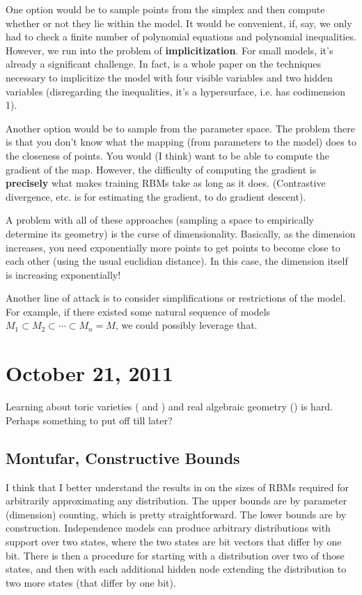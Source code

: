 \documentclass[12pt]{article}
\begin{document}
One option would be to sample points from the simplex and then compute whether
or not they lie within the model.  It would be convenient, if, say, we only had
to check a finite number of polynomial equations and polynomial inequalities.
However, we run into the problem of \textbf{implicitization}.  For small models,
it's already a significant challenge.  In fact, \cite{CTY10} is a whole paper on
the techniques necessary to implicitize the model with four visible variables
and two hidden variables (disregarding the inequalities, it's a hypersurface,
i.e. has codimension 1).

Another option would be to sample from the parameter space.  The problem there
is that you don't know what the mapping (from parameters to the model) does to
the closeness of points.  You would (I think) want to be able to compute the
gradient of the map.  However, the difficulty of computing the gradient is
\textbf{precisely} what makes training RBMs take as long as it does.
(Contrastive divergence, etc. is for estimating the gradient, to do gradient
descent).

A problem with all of these approaches (sampling a space to empirically
determine its geometry) is the curse of dimensionality.  Basically, as the
dimension increases, you need exponentially more points to get points to become
close to each other (using the usual euclidian distance).  In this case, the
dimension itself is increasing exponentially!

Another line of attack is to consider simplifications or restrictions of the
model.  For example, if there existed some natural sequence of models $M_1
\subset M_2 \subset \cdots \subset M_n = M$, we could possibly leverage that.

\section{October 21, 2011}

Learning about toric varieties (\cite{CLS09} and \cite{CLO98}) and real
algebraic geometry (\cite{Cos09}) is hard.  Perhaps something to put off till
later?

\subsection{Montufar, Constructive Bounds} 

I think that I better understand the results in \cite{Mon10} on the sizes of
RBMs required for arbitrarily approximating any distribution.  The upper bounds
are by parameter (dimension) counting, which is pretty straightforward.  The
lower bounds are by construction.  Independence models can produce arbitrary
distributions with support over two states, where the two states are bit vectors
that differ by one bit.  There is then a procedure for starting with a
distribution over two of those states, and then with each additional hidden node
extending the distribution to two more states (that differ by one bit).
\end{document}
